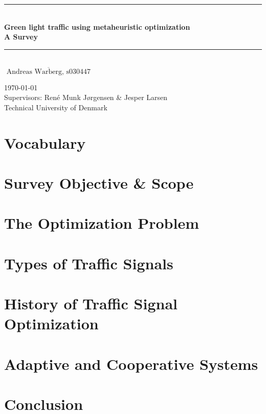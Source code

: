\documentclass [a4paper, 11pt, titlepage] {article}
\date{A date}
\begin{document}
\setlength{\parindent}{4mm}

\begin{titlepage}
  \begin{center}
    \noindent\rule{\linewidth}{1mm}\\[4mm]
      {\sffamily\bfseries \Huge Green light traffic using metaheuristic optimization}\\[1mm]
      {\sffamily\bfseries \Large
        A Survey}\\[0mm]
    \noindent\rule{\linewidth}{1mm}\\[30mm]
    \large $\overline{\textrm{ Andreas Warberg, s030447 }}$


    \large \today \\[6mm]
    Supervisors: Ren\'{e} Munk Jørgensen \& Jesper Larsen \\[3mm]
    Technical University of Denmark
  \end{center}
\end{titlepage}

\newpage
{}
\tableofcontents
\newpage
{}



\newpage

\section{Vocabulary}


\section{Survey Objective \& Scope}


\section{The Optimization Problem}


\section{Types of Traffic Signals}


\section{History of Traffic Signal Optimization}


\section{Adaptive and Cooperative Systems}


\clearpage
\pagebreak

\section{Conclusion}


\clearpage
\newpage





\clearpage
\newpage
\appendix
\end{document}
